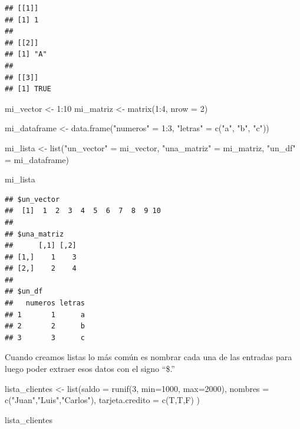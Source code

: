 \documentclass[
  12pt,
]{book}
\newenvironment{Shaded}{\begin{snugshade}}{\end{snugshade}}
\newcommand{\AttributeTok}[1]{\textcolor[rgb]{0.77,0.63,0.00}{#1}}
\newcommand{\DecValTok}[1]{\textcolor[rgb]{0.00,0.00,0.81}{#1}}
\newcommand{\FunctionTok}[1]{\textcolor[rgb]{0.00,0.00,0.00}{#1}}
\newcommand{\NormalTok}[1]{#1}
\newcommand{\OtherTok}[1]{\textcolor[rgb]{0.56,0.35,0.01}{#1}}
\newcommand{\SpecialCharTok}[1]{\textcolor[rgb]{0.00,0.00,0.00}{#1}}
\newcommand{\StringTok}[1]{\textcolor[rgb]{0.31,0.60,0.02}{#1}}
\begin{document}
\begin{verbatim}
## [[1]]
## [1] 1
## 
## [[2]]
## [1] "A"
## 
## [[3]]
## [1] TRUE
\end{verbatim}

\begin{Shaded}
\begin{Highlighting}[]
\NormalTok{mi\_vector }\OtherTok{\textless{}{-}} \DecValTok{1}\SpecialCharTok{:}\DecValTok{10}
\NormalTok{mi\_matriz }\OtherTok{\textless{}{-}} \FunctionTok{matrix}\NormalTok{(}\DecValTok{1}\SpecialCharTok{:}\DecValTok{4}\NormalTok{, }\AttributeTok{nrow =} \DecValTok{2}\NormalTok{)}

\NormalTok{mi\_dataframe }\OtherTok{\textless{}{-}} \FunctionTok{data.frame}\NormalTok{(}\StringTok{"numeros"} \OtherTok{=} \DecValTok{1}\SpecialCharTok{:}\DecValTok{3}\NormalTok{, }\StringTok{"letras"} \OtherTok{=} \FunctionTok{c}\NormalTok{(}\StringTok{"a"}\NormalTok{, }\StringTok{"b"}\NormalTok{, }\StringTok{"c"}\NormalTok{))}

\NormalTok{mi\_lista }\OtherTok{\textless{}{-}} \FunctionTok{list}\NormalTok{(}\StringTok{"un\_vector"} \OtherTok{=}\NormalTok{ mi\_vector, }\StringTok{"una\_matriz"} \OtherTok{=}\NormalTok{ mi\_matriz, }\StringTok{"un\_df"} \OtherTok{=}\NormalTok{ mi\_dataframe)}

\NormalTok{mi\_lista}
\end{Highlighting}
\end{Shaded}

\begin{verbatim}
## $un_vector
##  [1]  1  2  3  4  5  6  7  8  9 10
## 
## $una_matriz
##      [,1] [,2]
## [1,]    1    3
## [2,]    2    4
## 
## $un_df
##   numeros letras
## 1       1      a
## 2       2      b
## 3       3      c
\end{verbatim}

Cuando creamos listas lo más común es nombrar cada una de las entradas para luego poder extraer esos datos con el signo ``\$.''

\begin{Shaded}
\begin{Highlighting}[]
\NormalTok{lista\_clientes }\OtherTok{\textless{}{-}} \FunctionTok{list}\NormalTok{(}\AttributeTok{saldo =} \FunctionTok{runif}\NormalTok{(}\DecValTok{3}\NormalTok{, }\AttributeTok{min=}\DecValTok{1000}\NormalTok{, }\AttributeTok{max=}\DecValTok{2000}\NormalTok{), }\AttributeTok{nombres =} \FunctionTok{c}\NormalTok{(}\StringTok{"Juan"}\NormalTok{,}\StringTok{"Luis"}\NormalTok{,}\StringTok{"Carlos"}\NormalTok{), }\AttributeTok{tarjeta.credito =} \FunctionTok{c}\NormalTok{(T,T,F) )}


\NormalTok{lista\_clientes}
\end{Highlighting}
\end{Shaded}
\end{document}
